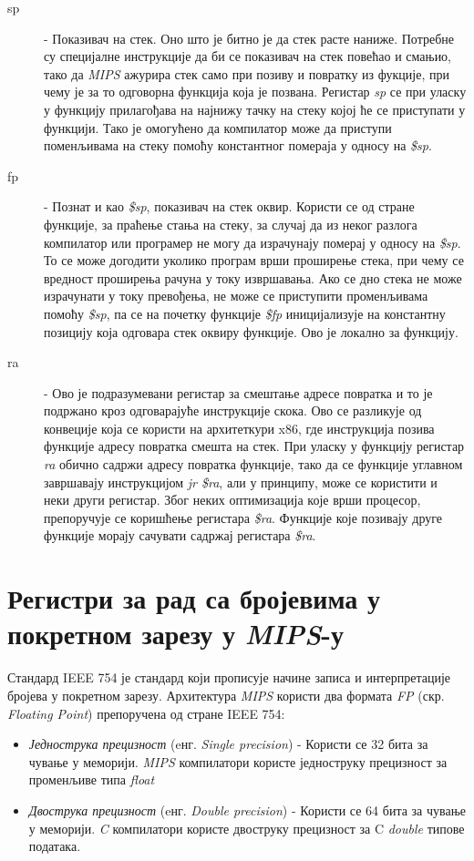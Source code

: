 \documentclass[12pt,oneside]{memoir}
\begin{document}
\begin{description}
  \item[sp] - Показивач на стек. Оно што је битно је да стек расте наниже. Потребне су специјалне инструкције да би се показивач на стек повећао и смањио, тако да \textit{MIPS} ажурира стек само при позиву и повратку из фукције, при чему је за то одговорна функција која је позвана. Регистар \textit{sp} се при уласку у функцију прилагођава на најнижу тачку на стеку којој ће се приступати у функцији. Тако је омогућено да компилатор може да приступи поменљивама на стеку помоћу константног помераја у односу на \textit{\$sp}.
  \item[fp] - Познат и као \textit{\$sp}, показивач на стек оквир. Користи се од стране функције, за праћење стања на стеку, за случај да из неког разлога компилатор или програмер не могу да израчунају померај у односу на \textit{\$sp}. То се може догодити уколико програм врши проширење стека, при чему се вредност проширења рачуна у току извршавања. Ако се дно стека не може израчунати у току превођења, не може се приступити променљивама помоћу \textit{\$sp}, па се на почетку функције \textit{\$fp} иницијализује на константну позицију која одговара стек оквиру функције. Ово је локално за функцију.
  \item[ra] - Ово је подразумевани регистар за смештање адресе повратка и то је подржано кроз одговарајуће инструкције скока. Ово се разликује од конвеције која се користи на архитеткури x86, где инструкција позива функције адресу повратка смешта на стек. При уласку у функцију регистар \textit{ra} обично садржи адресу повратка функције, тако да се функције углавном завршавају инструкцијом \textit{jr \$ra}, али у принципу, може се користити и неки други регистар. Због неких оптимизација које врши процесор, препоручује се коришћење регистара \textit{\$ra}. Функције које позивају друге функције морају сачувати садржај регистара \textit{\$ra}.
\end{description}


\section{Регистри за рад са бројевима у покретном зарезу у \textit{MIPS}-у}
\label{fp_registri}

Стандард IEEE 754 је стандард који прописује начине записа и интерпретације бројева у покретном зарезу. Архитектура \textit{MIPS} користи два формата \textit{FP} (скр. \textit{Floating Point}) препоручена од стране IEEE 754:

\begin{itemize}
	\item \textit{Једнострука прецизност} (eнг. \textit{Single precision}) - Користи се 32 бита за чување у меморији. \textit{MIPS} компилатори користе једноструку прецизност за променљиве типа \textit{float}
	\item \textit{Двострука прецизност} (eнг. \textit{Double precision}) - Користи се 64 бита за чување у меморији. \textit{C} компилатори користе двоструку прецизност за C \textit{double} типове података.
\end{itemize}
\end{document}

